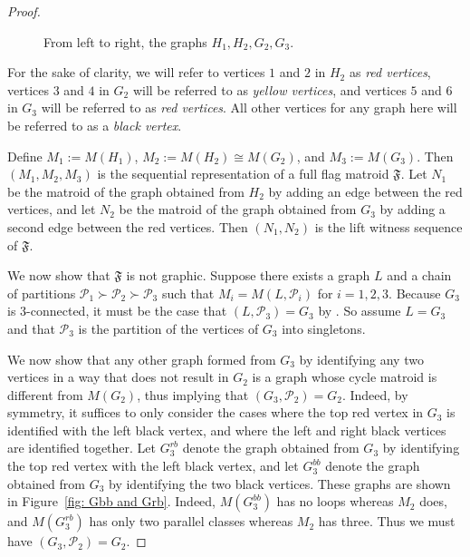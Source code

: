 \documentclass[12pt]{article}
\newcommand{\vertex}{\node[vertex]}
\theoremstyle{definition}
\begin{document}
\begin{proof}
\begin{figure}[H]
{\begin{tikzpicture}
\end{tikzpicture}
\hspace{10mm}
}
\caption{From left to right, the graphs $H_1,H_2,G_2,G_3$.}\label{fig: graphs}
\end{figure}
For the sake of clarity, we will refer to vertices $1$ and $2$ in $H_2$ as \emph{red vertices}, vertices $3$ and $4$ in $G_2$ will be referred to as \emph{yellow vertices}, and vertices $5$ and $6$ in $G_3$ will be referred to as \emph{red vertices}. All other vertices for any graph here will be referred to as a \emph{black vertex}.

Define $M_1 := M(H_1)$, $M_2 := M(H_2) \cong M(G_2)$, and $M_3 := M(G_3)$.
Then $(M_1, M_2, M_3)$ is the sequential representation of a full flag matroid $\mathfrak{F}$.
Let $N_1$ be the matroid of the graph obtained from $H_2$ by adding an edge between the red vertices, and let $N_2$ be the matroid of the graph obtained from $G_3$ by adding a second edge between the red vertices.
Then $(N_1,N_2)$ is the lift witness sequence of $\mathfrak{F}$.

We now show that $\mathfrak{F}$ is not graphic. 
Suppose there exists a graph $L$ and a chain of partitions $\mathcal{P}_1 \succ \mathcal{P}_2 \succ \mathcal{P}_3$
such that $M_i = M(L, \mathcal{P}_i)$ for $i = 1,2,3$.
Because $G_3$ is $3$-connected, it must be the case that $(L, \mathcal{P}_3) = G_3$ by \cite[Lemma~5.3.2]{oxley}.
So assume $L = G_3$ and that $\mathcal{P}_3$ is the partition of the vertices of $G_3$ into singletons.

We now show that any other graph formed from $G_3$ by identifying any two vertices in a way that does not result in $G_2$
is a graph whose cycle matroid is different from $M(G_2)$,
thus implying that $(G_3, \mathcal{P}_2) = G_2$.
Indeed, by symmetry,
it suffices to only consider the cases where the top red vertex in $G_3$ is identified with the left black vertex,
and where the left and right black vertices are identified together.
Let $G_3^{rb}$ denote the graph obtained from $G_3$ by identifying the top red vertex with the left black vertex,
and let $G_3^{bb}$ denote the graph obtained from $G_3$ by identifying the two black vertices.
These graphs are shown in Figure~\ref{fig: Gbb and Grb}.
Indeed, $M(G_3^{bb})$ has no loops whereas $M_2$ does,
and $M(G_3^{rb})$ has only two parallel classes whereas $M_2$ has three.
Thus we must have $(G_3,\mathcal{P}_2) = G_2$.



\end{proof}
\end{document}
